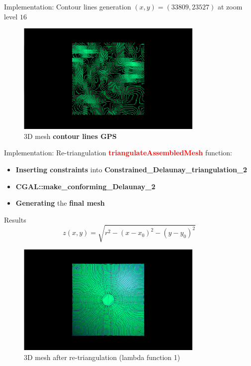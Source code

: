 \documentclass[10pt]{beamer}
\begin{document}
\begin{frame}{Implementation: Contour lines generation}
  \centering
  \Large
  $(x, y) = (33809, 23527)$ at zoom level $16$
  \begin{figure}[H]
      \centering
      \includegraphics[width=0.8\textwidth]{images/contour-strasbourg-16-1.png}
      \caption{3D mesh \textbf{contour lines GPS}}
  \end{figure}
\end{frame}

\begin{frame}{Implementation: Re-triangulation}
  \Large
  \textbf{\textcolor{red}{triangulateAssembledMesh}} function:
  \vspace{1em}
  \begin{itemize}
    \item \textbf{Inserting constraints} into \textbf{Constrained\_Delaunay\_triangulation\_2}
    \item \textbf{CGAL::make\_conforming\_Delaunay\_2}
    \item \textbf{Generating} the \textbf{final mesh}
  \end{itemize}
\end{frame}

\begin{frame}{Results}
  \Large
  \[
  z(x, y) = \sqrt{r^2 - (x - x_0)^2 - (y - y_0)^2}
  \]
  \begin{figure}[H]
    \centering
    \includegraphics[width=0.8\textwidth]{images/constrained-lambda-1.png}
    \caption{3D mesh after re-triangulation (lambda function 1)}
\end{figure}
\end{frame}
\end{document}
